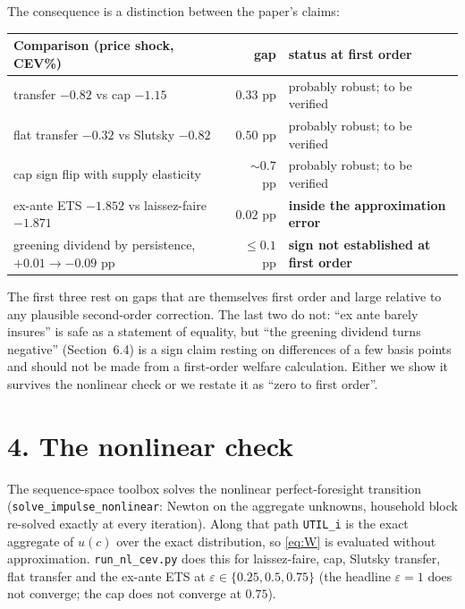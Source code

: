 \documentclass[11pt]{article}
\begin{document}
The consequence is a distinction between the paper's claims:
\begin{center}\small
\begin{tabular}{lrl}
\toprule
Comparison (price shock, CEV\%) & gap & status at first order\\
\midrule
transfer $-0.82$ vs cap $-1.15$ & $0.33$ pp & probably robust; to be verified\\
flat transfer $-0.32$ vs Slutsky $-0.82$ & $0.50$ pp & probably robust; to be verified\\
cap sign flip with supply elasticity & $\sim0.7$ pp & probably robust; to be verified\\
ex-ante ETS $-1.852$ vs laissez-faire $-1.871$ & $0.02$ pp & \textbf{inside the approximation error}\\
greening dividend by persistence, $+0.01\to-0.09$ pp & $\le 0.1$ pp & \textbf{sign not established at first order}\\
\bottomrule
\end{tabular}
\end{center}
The first three rest on gaps that are themselves first order and large relative to any plausible second-order correction. The last two do not: ``ex ante barely insures'' is safe as a statement of equality, but ``the greening dividend turns negative'' (Section~6.4) is a sign claim resting on differences of a few basis points and should not be made from a first-order welfare calculation. Either we show it survives the nonlinear check or we restate it as ``zero to first order''.

\section*{4. The nonlinear check}

The sequence-space toolbox solves the nonlinear perfect-foresight transition (\texttt{solve\_impulse\_nonlinear}: Newton on the aggregate unknowns, household block re-solved exactly at every iteration). Along that path \texttt{UTIL\_i} is the exact aggregate of $u(c)$ over the exact distribution, so \eqref{eq:W} is evaluated without approximation. \texttt{run\_nl\_cev.py} does this for laissez-faire, cap, Slutsky transfer, flat transfer and the ex-ante ETS at $\varepsilon\in\{0.25,0.5,0.75\}$ (the headline $\varepsilon=1$ does not converge; the cap does not converge at $0.75$).
\end{document}
